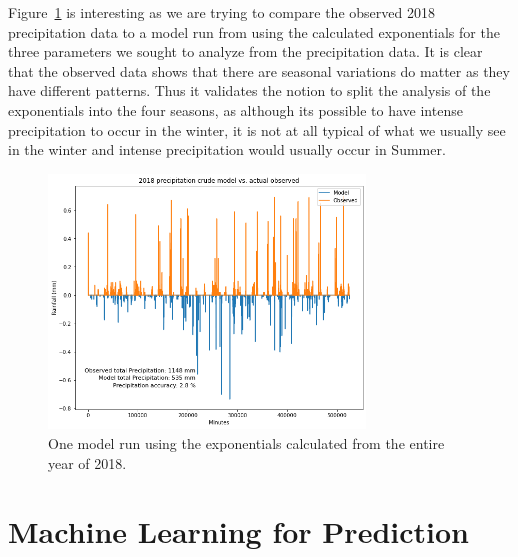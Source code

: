 \documentclass[11pt]{report}
\begin{document}
Figure~\ref{crudesmodel_whole2018} is interesting as we are trying to
compare the observed 2018 precipitation data to a model run from using the
calculated exponentials for the three parameters we sought to analyze from
the precipitation data. It is clear that the observed data shows that there
are seasonal variations do matter as they have different patterns.  Thus it
validates the notion to split the analysis of the exponentials into the four
seasons, as although its possible to have intense precipitation to occur in
the winter, it is not at all typical of what we usually see in the winter
and intense precipitation would usually occur in Summer.\\[1em]

\begin{figure}[h!]
  \centering
  \includegraphics[width=0.75\textwidth]{Figures/whole2018_model.png}
  \caption[Running model for entire 2018 ]
  {\label{crudesmodel_whole2018}One model run using the exponentials calculated from
    the entire year of 2018. }
\end{figure}

\clearpage

\section{Machine Learning for Prediction}\label{sec:MLP}




\end{document}
